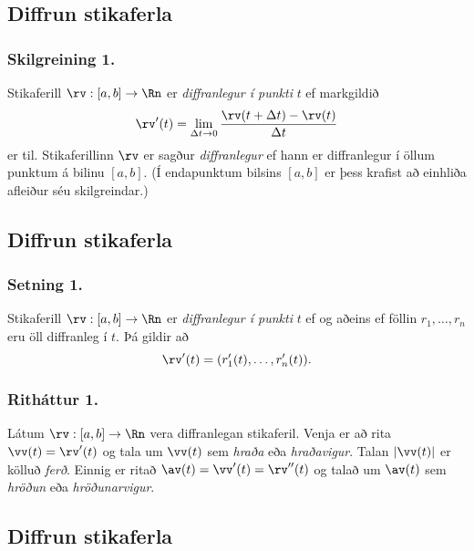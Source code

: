 \subsection{Diffrun stikaferla}
 \subsubsection{Skilgreining 1.}
Stikaferill $\rv:  [a,b]\rightarrow \Rn$ er
{\em diffranlegur í punkti} $t$ ef markgildið 
$$\rv'(t)=\lim_{\Delta t\rightarrow 0}\frac{\rv(t+\Delta t)-\rv(t)}{\Delta t}$$
er til.  Stikaferillinn $\rv$ er sagður {\em diffranlegur} ef hann er
diffranlegur í öllum punktum á bilinu $[a,b]$.  (Í endapunktum bilsins
$[a,b]$ er þess krafist að einhliða afleiður séu skilgreindar.)



\subsection{Diffrun stikaferla}
\subsubsection{\nopagebreak Setning 1.}  
   Stikaferill $\rv:  [a,b]\rightarrow \Rn$ er
{\em diffranlegur í punkti} $t$ ef og aðeins ef föllin $r_1,\ldots,r_n$ eru
öll diffranleg í $t$.  Þá gildir að  
$$\rv'(t)=(r'_1(t),\ldots,r'_n(t)).$$ 
 
 \pause
\subsubsection{\nopagebreak Ritháttur 1.}   Látum $\rv:  [a,b]\rightarrow \Rn$ vera diffranlegan stikaferil.  Venja er að rita $\vv(t)=\rv'(t)$ og tala um
$\vv(t)$ sem {\em hraða} eða {\em hraðavigur}.   Talan $|\vv(t)|$ er
kölluð {\em ferð}.   Einnig er ritað $\av(t)=\vv'(t)=\rv''(t)$ og talað
um $\av(t)$ sem {\em hröðun} eða {\em hröðunarvigur}.  




\subsection{Diffrun stikaferla}
